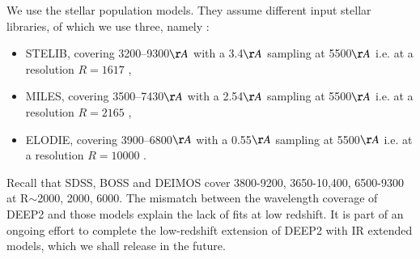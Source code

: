\documentclass[onecolumn]{aa}
\begin{document}
We use the \citet{Maraston_2011} stellar population models. 
They assume different input stellar libraries, of which we use three, namely :
\begin{itemize}
\item STELIB, covering 3200–9300$\AA$ with a 3.4$\AA$ sampling at 5500$\AA$ i.e. at a resolution $R=1617$ \citep{leborgne2003},  
\item MILES, covering 3500–7430$\AA$ with a 2.54$\AA$ sampling at 5500$\AA$ i.e. at a resolution $R=2165$ \citep{MILES_2006,MILES_2011},
\item ELODIE, covering 3900–6800$\AA$ with a 0.55$\AA$ sampling at 5500$\AA$ i.e. at a resolution $R=10000$ \citep{Prugniel2007}.
\end{itemize}
Recall that SDSS, BOSS and DEIMOS cover 3800-9200, 3650-10,400, 6500-9300 at R$\sim$2000, 2000, 6000. The mismatch between the wavelength coverage of DEEP2 and those models explain the lack of fits at low redshift. It is part of an ongoing effort to complete the low-redshift extension of DEEP2 with IR extended models, which we shall release in the future.
% 
\end{document}
